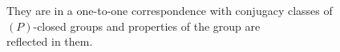 \documentclass[preview]{standalone}
\begin{document}
\begin{center}
They are in a one-to-one correspondence with conjugacy classes of \\ $(P)$-closed groups and properties of the group are \\ reflected in them.
\end{center}
\end{document}
